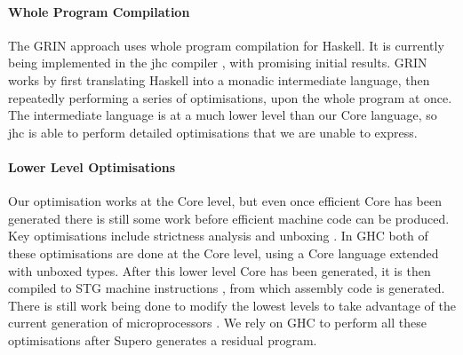 \paragraph{Whole Program Compilation} The GRIN approach \cite{grin} uses whole program compilation for Haskell. It is currently being implemented in the jhc compiler \cite{jhc}, with promising initial results. GRIN works by first translating Haskell into a monadic intermediate language, then repeatedly performing a series of optimisations, upon the whole program at once. The intermediate language is at a much lower level than our Core language, so jhc is able to perform detailed optimisations that we are unable to express.

\paragraph{Lower Level Optimisations} Our optimisation works at the Core level, but even once efficient Core has been generated there is still some work before efficient machine code can be produced. Key optimisations include strictness analysis and unboxing \cite{spj:unboxing}. In GHC both of these optimisations are done at the Core level, using a Core language extended with unboxed types. After this lower level Core has been generated, it is then compiled to STG machine instructions \cite{spj:stg}, from which assembly code is generated. There is still work being done to modify the lowest levels to take advantage of the current generation of microprocessors \cite{marlow:pointer_tagging}. We rely on GHC to perform all these optimisations after Supero generates a residual program.

